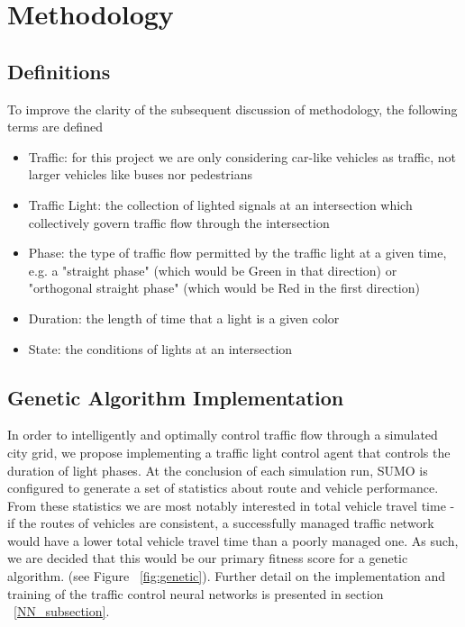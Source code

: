 \documentclass[twocolumn]{article}
\begin{document}
\section{Methodology}

\subsection{Definitions}

To improve  the clarity of the subsequent discussion of methodology, the following terms are defined

\begin{itemize}
\item Traffic: for this project we are only considering car-like vehicles as traffic, not larger vehicles like buses nor pedestrians
\item Traffic Light: the collection of lighted signals at an intersection which collectively govern traffic flow through the intersection
\item Phase: the type of traffic flow permitted by the traffic light at a given time, e.g. a "straight phase" (which would be Green in that direction) or "orthogonal straight phase" (which would be Red in the first direction)
\item Duration: the length of time that a light is a given color
\item State: the conditions of lights at an intersection
\end{itemize}


\subsection{Genetic Algorithm Implementation}

In order to intelligently and optimally control traffic flow through a simulated city grid, we propose implementing a traffic light control agent that controls the duration of light phases. At the conclusion of each simulation run, SUMO is configured to generate a set of statistics about route and vehicle performance. From these statistics we are most notably interested in total vehicle travel time - if the routes of vehicles are consistent, a successfully managed traffic network would have a lower total vehicle travel time than a poorly managed one. As such, we are decided that this would be our primary fitness score for a genetic algorithm. (see Figure ~\ref{fig:genetic}). Further detail on the implementation and training of the traffic control neural networks is presented in section ~\ref{NN_subsection}.
\end{document}
